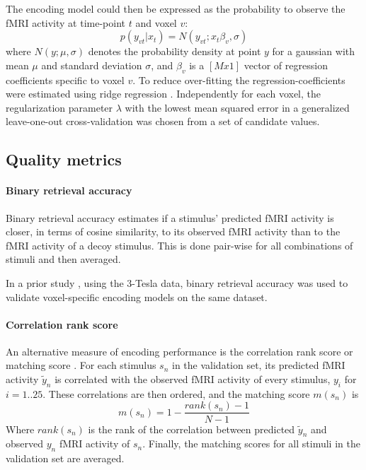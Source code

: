 The encoding model could then be expressed as the probability to observe the f{MRI} activity at time-point $t$ and voxel $v$:
%
\begin{equation}
  \label{eq:encmo}
  p(y_{vt}|x_{t}) = N(y_{vt};x_{t}\beta_{v},\sigma)
\end{equation}
%
where $N(y;\mu,\sigma)$ denotes the probability density at point $y$ for a
gaussian with mean $\mu$ and standard deviation $\sigma$, and $\beta_{v}$ is a
$[Mx1]$ vector of regression coefficients specific to voxel $v$. To reduce
over-fitting the regression-coefficients were estimated using ridge regression
\citep{HK70}.  Independently for each voxel, the regularization parameter
$\lambda$ with the lowest mean squared error in a generalized leave-one-out
cross-validation \citep{GHW79} was chosen from a set of candidate values.

\subsection*{Quality metrics} 

\paragraph{Binary retrieval accuracy}

Binary retrieval accuracy \citep{ML08} estimates if a stimulus'
predicted f{MRI} activity is closer, in terms of cosine similarity, to its
observed f{MRI} activity than to the f{MRI} activity of a decoy stimulus.
This is done pair-wise for all combinations of stimuli and
then averaged.

In a prior study \citep{CTK+2012}, using the 3-Tesla data, binary retrieval
accuracy was used to validate voxel-specific encoding models on the same
dataset.

\paragraph{Correlation rank score}
%
An alternative measure of encoding performance is the correlation rank score or
matching score \citep{SF14}. For each stimulus $s_{n}$ in the validation set,
its predicted f{MRI} activity $\widetilde{y}_{n}$ is correlated with the
observed f{MRI} activity of every stimulus, $y_{i}$ for $i=1..25$. These
correlations are then ordered, and the  matching score $m(s_{n})$ is \[
m(s_{n}) = 1-\frac{rank(s_{n})-1}{N-1} \] Where $rank(s_{n})$ is the rank of
the correlation between predicted $\widetilde{y}_{n}$ and observed $y_{n}$
f{MRI} activity of $s_{n}$. Finally, the matching scores for all stimuli in the
validation set are averaged.

